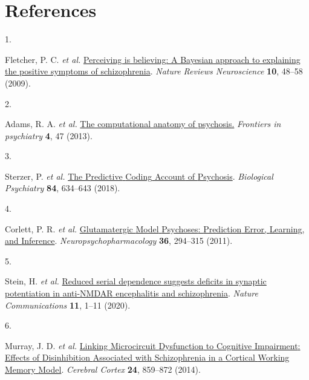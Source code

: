 \documentclass[
]{article}
\newlength{\cslhangindent}
\newlength{\csllabelwidth}
\newlength{\cslentryspacingunit} %
\newenvironment{CSLReferences}[2] %
 {%
  \setlength{\parindent}{0pt}
  \ifodd #1
  \let\oldpar\par
  \def\par{\hangindent=\cslhangindent\oldpar}
  \fi
  \setlength{\parskip}{#2\cslentryspacingunit}
 }%
 {}
\newcommand{\CSLLeftMargin}[1]{\parbox[t]{\csllabelwidth}{#1}}
\newcommand{\CSLRightInline}[1]{\parbox[t]{\linewidth - \csllabelwidth}{#1}\break}
\begin{document}
\newpage

\hypertarget{references}{%
\section*{References}\label{references}}

\hypertarget{refs}{}
\begin{CSLReferences}{0}{0}
\leavevmode{}%
\CSLLeftMargin{1. }%
\CSLRightInline{Fletcher, P. C. \emph{et al.}
\href{https://doi.org/10.1038/nrn2536}{Perceiving is believing: A
{Bayesian} approach to explaining the positive symptoms of
schizophrenia}. \emph{Nature Reviews Neuroscience} \textbf{10}, 48--58
(2009).}

\leavevmode{}%
\CSLLeftMargin{2. }%
\CSLRightInline{Adams, R. A. \emph{et al.}
\href{https://doi.org/10.3389/fpsyt.2013.00047}{The computational
anatomy of psychosis.} \emph{Frontiers in psychiatry} \textbf{4}, 47
(2013).}

\leavevmode{}%
\CSLLeftMargin{3. }%
\CSLRightInline{Sterzer, P. \emph{et al.}
\href{https://doi.org/10.1016/j.biopsych.2018.05.015}{The {Predictive}
{Coding} {Account} of {Psychosis}}. \emph{Biological Psychiatry}
\textbf{84}, 634--643 (2018).}

\leavevmode{}%
\CSLLeftMargin{4. }%
\CSLRightInline{Corlett, P. R. \emph{et al.}
\href{https://doi.org/10.1038/npp.2010.163}{Glutamatergic {Model}
{Psychoses}: {Prediction} {Error}, {Learning}, and {Inference}}.
\emph{Neuropsychopharmacology} \textbf{36}, 294--315 (2011).}

\leavevmode{}%
\CSLLeftMargin{5. }%
\CSLRightInline{Stein, H. \emph{et al.}
\href{https://doi.org/10.1038/s41467-020-18033-3}{Reduced serial
dependence suggests deficits in synaptic potentiation in anti-{NMDAR}
encephalitis and schizophrenia}. \emph{Nature Communications}
\textbf{11}, 1--11 (2020).}

\leavevmode{}%
\CSLLeftMargin{6. }%
\CSLRightInline{Murray, J. D. \emph{et al.}
\href{https://doi.org/10.1093/cercor/bhs370}{Linking {Microcircuit}
{Dysfunction} to {Cognitive} {Impairment}: {Effects} of {Disinhibition}
{Associated} with {Schizophrenia} in a {Cortical} {Working} {Memory}
{Model}}. \emph{Cerebral Cortex} \textbf{24}, 859--872 (2014).}


\end{CSLReferences}
\end{document}
